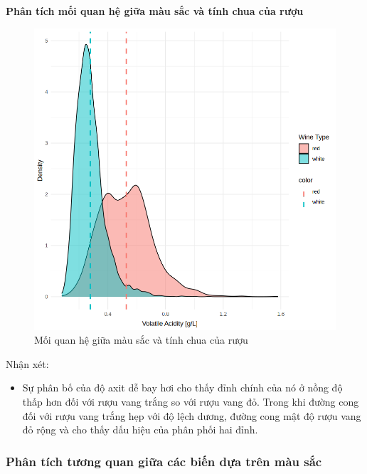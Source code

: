 \textbf{Phân tích mối quan hệ giữa màu sắc và tính chua của rượu}
\begin{figure}[H]
    \centering
    \includegraphics[width=0.75\columnwidth]{wine_colors/wine_color_volatile_acidity.png}
    \caption{Mối quan hệ giữa màu sắc và tính chua của rượu}
    \label{fig:wine_color_volatile_acidity}
\end{figure}
Nhận xét:
\begin{itemize}
    \item Sự phân bố của độ axit dễ bay hơi cho thấy đỉnh chính của nó ở nồng độ thấp hơn đối với rượu vang trắng so với rượu vang đỏ. Trong khi đường cong đối với rượu vang trắng hẹp với độ lệch dương, đường cong mật độ rượu vang đỏ rộng và cho thấy dấu hiệu của phân phối hai đỉnh.
\end{itemize}

\subsubsection{Phân tích tương quan giữa các biến dựa trên màu sắc}

